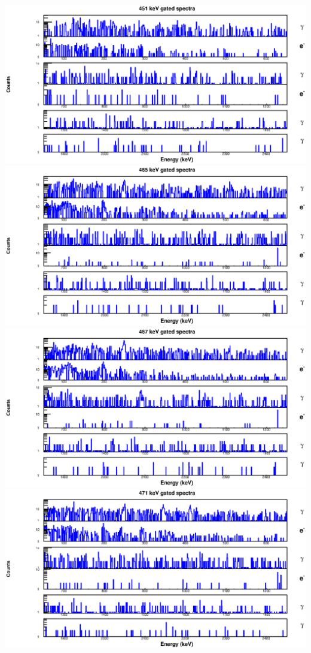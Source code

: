 \begin{landscape}
\includegraphics[scale=1.2]{154Gd_Appendix/451_combined.eps}
\includegraphics[scale=1.2]{154Gd_Appendix/465_combined.eps}
\includegraphics[scale=1.2]{154Gd_Appendix/467_combined.eps}
\includegraphics[scale=1.2]{154Gd_Appendix/471_combined.eps}

\end{landscape}
